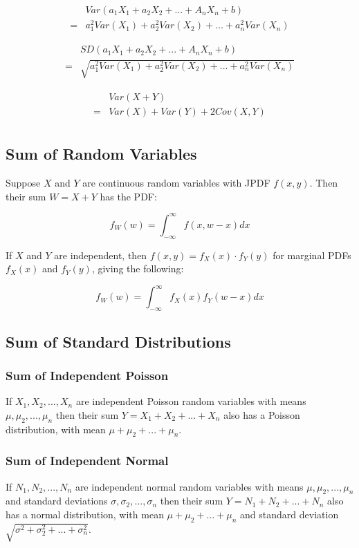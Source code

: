 \begin{align*}
    & Var(a_1X_1+a_2X_2+...+A_nX_n+b)                  \\
  = & a_1^2 Var(X_1)+a_2^2 Var(X_2)+...+a_n^2 Var(X_n)
\end{align*}

\begin{align*}
    & SD(a_1X_1+a_2X_2+...+A_nX_n+b)                          \\
  = & \sqrt{a_1^2 Var(X_1)+a_2^2 Var(X_2)+...+a_n^2 Var(X_n)}
\end{align*}

\begin{align*}
    & Var(X+Y)                \\
  = & Var(X)+Var(Y)+2Cov(X,Y) \\
\end{align*}

\subsection*{Sum of Random Variables}

Suppose $X$ and $Y$ are continuous random variables with JPDF $f(x,y)$. Then their sum $W=X+Y$ has the PDF:

$$ f_W(w) = \int_{-\infty}^{\infty} f(x,w-x) dx $$

If $X$ and $Y$ are independent, then $f(x,y) = f_X(x)\cdot f_Y(y)$ for marginal PDFs $f_X(x)$ and $f_Y(y)$, giving the following:

$$ f_W(w) = \int_{-\infty}^{\infty} f_X(x) f_Y(w-x) dx $$

\subsection*{Sum of Standard Distributions}

\subsubsection*{Sum of Independent Poisson}

If $X_1,X_2,...,X_n$ are independent Poisson random variables with means $\mu,\mu_2,...,\mu_n$ then their sum $Y=X_1+X_2+...+X_n$ also has a Poisson distribution, with mean $\mu+\mu_2+...+\mu_n$.

\subsubsection*{Sum of Independent Normal}

If $N_1,N_2,...,N_n$ are independent normal random variables with means $\mu,\mu_2,...,\mu_n$ and standard deviations $\sigma,\sigma_2,...,\sigma_n$ then their sum $Y=N_1+N_2+...+N_n$ also has a normal distribution, with mean $\mu+\mu_2+...+\mu_n$ and standard deviation $\sqrt{\sigma^2+\sigma_2^2+...+\sigma_n^2}$.

